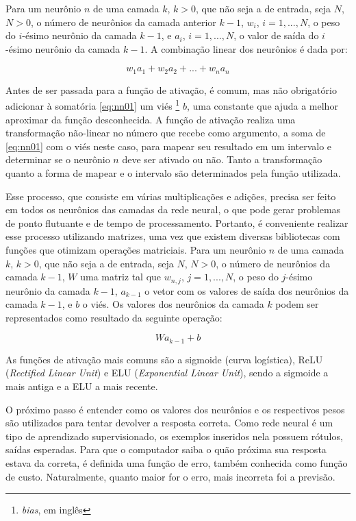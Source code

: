 Para um neurônio $n$ de uma camada $k$, $k > 0$, que não seja a de entrada, seja $N$, $N > 0$, o número de neurônios da camada anterior $k-1$, $w_{i}$, $i = 1, ..., N$, o peso do $i$-ésimo neurônio da camada $k-1$, e $a_{i}$, $i = 1, ..., N$, o valor de saída do $i$-ésimo neurônio da camada $k-1$.
A combinação linear dos neurônios é dada por:

\begin{equation} \label{eq:nn01}
w_{1}a_{1} + w_{2}a_{2} + ... + w_{n}a_{n}
\end{equation}

Antes de ser passada para a função de ativação, é comum, mas não obrigatório adicionar à somatória \ref{eq:nn01} um viés \footnote{\textit{bias}, em inglês} $b$, uma constante que ajuda a melhor aproximar da função desconhecida.
A função de ativação realiza uma transformação não-linear no número que recebe como argumento, a soma de \ref{eq:nn01} com o viés neste caso, para mapear seu resultado em um intervalo e determinar se o neurônio $n$ deve ser ativado ou não.
Tanto a transformação quanto a forma de mapear e o intervalo são determinados pela função utilizada.

Esse processo, que consiste em várias multiplicações e adições, precisa ser feito em todos os neurônios das camadas da rede neural, o que pode gerar problemas de ponto flutuante e de tempo de processamento.
Portanto, é conveniente realizar esse processo utilizando matrizes, uma vez que existem diversas bibliotecas com funções que otimizam operações matriciais.
Para um neurônio $n$ de uma camada $k$, $k > 0$, que não seja a de entrada, seja $N$, $N > 0$, o número de neurônios da camada $k-1$, $W$ uma matriz tal que $w_{n, j}$, $j = 1, ..., N$, o peso do $j$-ésimo neurônio da camada $k-1$, $a_{k-1}$ o vetor com os valores de saída dos neurônios da camada $k-1$, e $b$ o viés.
Os valores dos neurônios da camada $k$ podem ser representados como resultado da seguinte operação:

\begin{equation} \label{eq:nn02}
Wa_{k-1} + b
\end{equation}

As funções de ativação mais comuns são a sigmoide (curva logística), ReLU (\textit{Rectified Linear Unit}) e ELU (\textit{Exponential Linear Unit}), sendo a sigmoide a mais antiga e a ELU a mais recente.

O próximo passo é entender como os valores dos neurônios e os respectivos pesos são utilizados para tentar devolver a resposta correta.
Como rede neural é um tipo de aprendizado supervisionado, os exemplos inseridos nela possuem rótulos, saídas esperadas.
Para que o computador saiba o quão próxima sua resposta estava da correta, é definida uma função de erro, também conhecida como função de custo.
Naturalmente, quanto maior for o erro, mais incorreta foi a previsão.%

